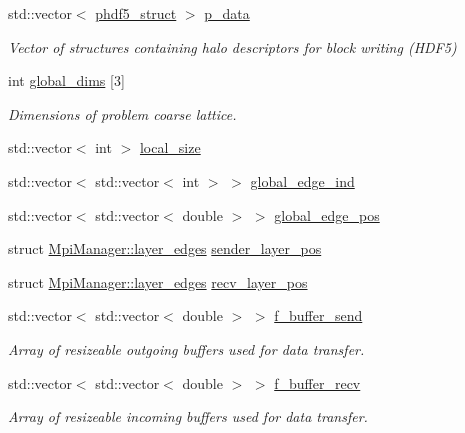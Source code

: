 \begin{DoxyCompactItemize}
std\+::vector$<$ \hyperlink{struct_mpi_manager_1_1phdf5__struct}{phdf5\+\_\+struct} $>$ \hyperlink{class_mpi_manager_a03972530e718d5b0a7f119e9c6132179}{p\+\_\+data}
\begin{DoxyCompactList}\small\item\em Vector of structures containing halo descriptors for block writing (H\+D\+F5) \end{DoxyCompactList}\item 
int \hyperlink{class_mpi_manager_ae41fb382e17680a49821077167bf1905}{global\+\_\+dims} \mbox{[}3\mbox{]}
\begin{DoxyCompactList}\small\item\em Dimensions of problem coarse lattice. \end{DoxyCompactList}\item 
std\+::vector$<$ int $>$ \hyperlink{class_mpi_manager_ad4a918a4cd19e644ff3295b2854fc6af}{local\+\_\+size}
\item 
std\+::vector$<$ std\+::vector$<$ int $>$ $>$ \hyperlink{class_mpi_manager_a0f994471f9c2986b2c8606b7b716566a}{global\+\_\+edge\+\_\+ind}
\item 
std\+::vector$<$ std\+::vector$<$ double $>$ $>$ \hyperlink{class_mpi_manager_abd8c87e0a21d31b59d7cc1f7f146d5f4}{global\+\_\+edge\+\_\+pos}
\item 
struct \hyperlink{struct_mpi_manager_1_1layer__edges}{Mpi\+Manager\+::layer\+\_\+edges} \hyperlink{class_mpi_manager_a7201074f50eab0d0d667394e04a7cf24}{sender\+\_\+layer\+\_\+pos}
\item 
struct \hyperlink{struct_mpi_manager_1_1layer__edges}{Mpi\+Manager\+::layer\+\_\+edges} \hyperlink{class_mpi_manager_a998340f11dea2614b477e463a1bec543}{recv\+\_\+layer\+\_\+pos}
\item 
std\+::vector$<$ std\+::vector$<$ double $>$ $>$ \hyperlink{class_mpi_manager_aafbb74832f69a915927b9bf252bd971d}{f\+\_\+buffer\+\_\+send}
\begin{DoxyCompactList}\small\item\em Array of resizeable outgoing buffers used for data transfer. \end{DoxyCompactList}\item 
std\+::vector$<$ std\+::vector$<$ double $>$ $>$ \hyperlink{class_mpi_manager_ab8f1eeab50fd4812b3a51af1a6c43713}{f\+\_\+buffer\+\_\+recv}
\begin{DoxyCompactList}\small\item\em Array of resizeable incoming buffers used for data transfer. \end{DoxyCompactList}\item 

\end{DoxyCompactItemize}
